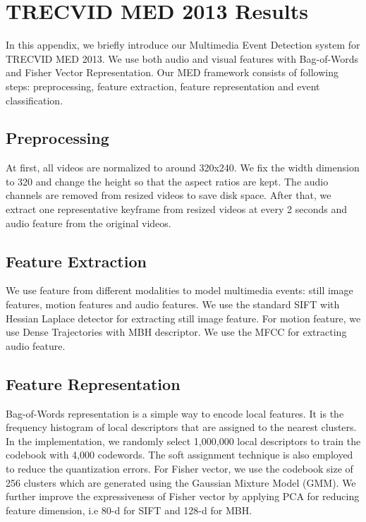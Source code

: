\chapter{TRECVID MED 2013 Results} 

\ifpdf
\graphicspath{{Appendix1/Figs/Raster/}{Appendix1/Figs/PDF/}{Appendix1/Figs/}}
\else
\graphicspath{{Appendix1/Figs/Vector/}{Appendix1/Figs/}}
\fi

In this appendix, we briefly introduce our Multimedia Event Detection system for TRECVID MED 2013. We use both audio and visual features with Bag-of-Words and Fisher Vector Representation. Our MED framework consists of following steps: preprocessing, feature extraction, feature representation and event classification.

\section{Preprocessing} At first, all videos are normalized to around 320x240. We fix the width dimension to 320 and change the height so that the aspect ratios are kept. The audio channels are removed from resized videos to save disk space. After that, we extract one representative keyframe from resized videos at every 2 seconds and audio feature from the original videos. 

\section{Feature Extraction} We use feature from different modalities to model multimedia events: still image features, motion features and audio features. We use the standard SIFT with Hessian Laplace detector for extracting still image feature. For motion feature, we use Dense Trajectories with MBH descriptor. We use the MFCC for extracting audio feature. 

\section{Feature Representation} Bag-of-Words representation is a simple way to encode local features. It is the frequency histogram of local descriptors that are assigned to the nearest clusters. In the implementation, we randomly select 1,000,000 local descriptors to train the codebook with 4,000 codewords. The soft assignment technique is also employed to reduce the quantization errors. For Fisher vector, we use the codebook size of 256 clusters which are generated using the Gaussian Mixture Model (GMM). We further improve the expressiveness of Fisher vector by applying PCA for reducing feature dimension, i.e 80-d for SIFT and 128-d for MBH. 

